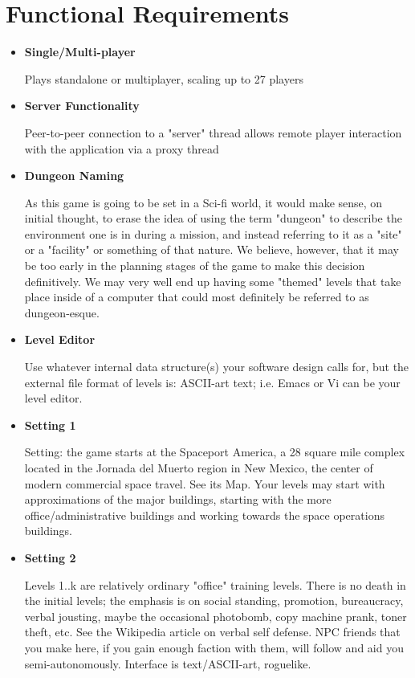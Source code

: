 \documentclass[12pt]{article}
\begin{document}
\section{Functional Requirements}
\begin{itemize}
	\item \textbf{Single/Multi-player}
	
	Plays standalone or multiplayer, scaling up to 27 players
	
	\item \textbf{Server Functionality}
	
	Peer-to-peer connection to a "server" thread allows remote player
	interaction with the application via a proxy thread
	
	\item \textbf{Dungeon Naming} %
	
	As this game is going to be set in a Sci-fi world, it would make sense, on 
	initial thought, to erase the idea of using the term "dungeon" to describe 
	the environment one is in during a mission, and instead referring to it as 
	a "site" or a "facility" or something of that nature. We believe, however, 
	that it may be too early in the planning stages of the game to make this 
	decision definitively. We may very well end up having some "themed" levels 
	that take place inside of a computer that could most definitely be referred 
	to as dungeon-esque. 
	
	\item \textbf{Level Editor}
	
	Use whatever internal data structure(s) your software design calls
	for, but the external file format of levels is: ASCII-art text; i.e.
	Emacs or Vi can be your level editor.
	
	\item \textbf{Setting 1}
	
	Setting: the game starts at the Spaceport America, a 28 square mile
	complex located in the Jornada del Muerto region in New Mexico, the
	center of modern commercial space travel. See its Map. Your levels may
	start with approximations of the major buildings, starting with the more
	office/administrative buildings and working towards the space operations
	buildings.
	
	\item \textbf{Setting 2}
	
	Levels 1..k are relatively ordinary "office" training levels. There is
	no death in the initial levels; the emphasis is on social standing,
	promotion, bureaucracy, verbal jousting, maybe the occasional photobomb,
	copy machine prank, toner theft, etc. See the Wikipedia article on
	verbal self defense. NPC friends that you make here, if you gain enough
	faction with them, will follow and aid you semi-autonomously. Interface
	is text/ASCII-art, roguelike. 
	

\end{itemize}
\end{document}
